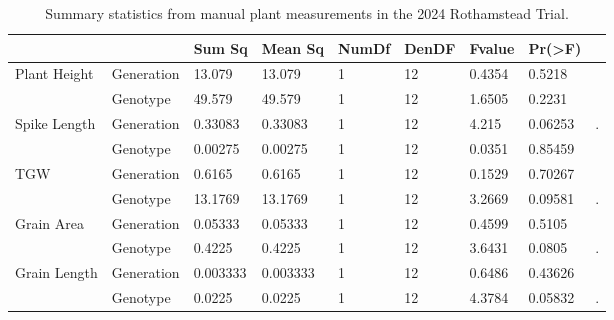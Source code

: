 \documentclass{article}
\begin{document}
\begin{table}[ht]
	\centering
	\caption{Summary statistics from manual plant measurements in the 2024
		Rothamstead Trial.}
	\begin{adjustbox}
		{width=\textwidth}
		\begin{tabular}{@{}lllllllll@{}}
			\toprule                               & \textbf{}     & \textbf{Sum Sq} & \textbf{Mean Sq} & \textbf{NumDf} & \textbf{DenDF} & \textbf{Fvalue} & \textbf{Pr(\textgreater{}F)} &   \\
			\midrule \multirow{2}{*}{Plant Height} & Generation    & 13.079          & 13.079           & 1              & 12             & 0.4354          & 0.5218                       &   \\
			                                       & Genotype      & 49.579          & 49.579           & 1              & 12             & 1.6505          & 0.2231                       &   \\
			\midrule \multirow{2}{*}{Spike Length} & Generation    & 0.33083         & 0.33083          & 1              & 12             & 4.215           & 0.06253                      & . \\
			                                       & Genotype      & 0.00275         & 0.00275          & 1              & 12             & 0.0351          & 0.85459                      &   \\
			\midrule \multirow{2}{*}{TGW}          & Generation    & 0.6165          & 0.6165           & 1              & 12             & 0.1529          & 0.70267                      &   \\
			                                       & Genotype      & 13.1769         & 13.1769          & 1              & 12             & 3.2669          & 0.09581                      & . \\
			\midrule \multirow{2}{*}{Grain Area}   & Generation    & 0.05333         & 0.05333          & 1              & 12             & 0.4599          & 0.5105                       &   \\
			                                       & Genotype      & 0.4225          & 0.4225           & 1              & 12             & 3.6431          & 0.0805                       & . \\
			\midrule \multirow{2}{*}{Grain Length} & Generation    & 0.003333        & 0.003333         & 1              & 12             & 0.6486          & 0.43626                      &   \\
			                                       & Genotype      & 0.0225          & 0.0225           & 1              & 12             & 4.3784          & 0.05832                      & . \\

\end{tabular}
\end{adjustbox}
\end{table}
\end{document}
